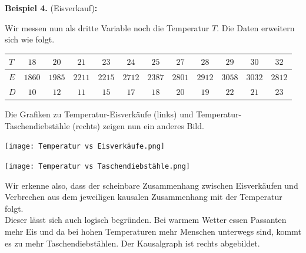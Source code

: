 \documentclass[headsepline,11pt,bibliography=leveldown]{scrbook}
\newcounter{NewZaehler}
\newcommand{\NewZahl}{\refstepcounter{NewZaehler}4.\theNewZaehler}
\newenvironment{NewBeispiel}[1]{\par\medskip\textbf{Beispiel \NewZahl} #1\textbf{:}\\}{\par\medskip}
\newcommand{\kom}[1]{\ignorespaces}
\begin{document}
\begin{NewBeispiel}{(Eisverkauf)\cite[S. 54f]{Primer}}
\begin{center}
\end{center}

Wir messen nun als dritte Variable noch die Temperatur $T$. Die Daten erweitern sich wie folgt.
\begin{center}
\begin{tabular}{| l | c | c | c | c | c | c | c | c | c | c | c |}
\hline
$T$ & $18$ & $20$ & $21$ & $23$ & $24$ & $25$ & $27$ & $28$ & $29$ & $30$ & $32$\\
\hline
$E$ & $1860$ & $1985$ & $2211$ & $2215$ & $2712$ & $2387$ & $2801$ & $2912$ & $3058$ & $3032$ & $2812$\\
\hline
$D$ & $10$ & $12$ & $11$ & $15$ & $17$ & $18$ & $20$ & $19$ & $22$ & $21$ & $23$\\
\hline
\end{tabular}
\end{center}
Die Grafiken zu Temperatur-Eisverkäufe (links) \kom{Eis-Taschendiebstähle-Temperatur.py} und Temperatur-Taschendiebstähle (rechts) \kom{Eis-Taschendiebstähle-Temperatur.py} zeigen nun ein anderes Bild.\\
\begin{minipage}{0.5\linewidth}
\begin{center}
	\texttt{[image: Temperatur vs Eisverkäufe.png]}
\end{center}
\end{minipage}
\begin{minipage}{0.5\linewidth}
\begin{center}
	\texttt{[image: Temperatur vs Taschendiebstähle.png]}
\end{center}
\end{minipage}
\begin{minipage}{0.5\linewidth}
Wir erkenne also, dass der scheinbare Zusammenhang zwischen Eisverkäufen und Verbrechen aus dem jeweiligen kausalen Zusammenhang mit der Temperatur folgt.\\
Dieser lässt sich auch logisch begründen. Bei warmem Wetter essen Passanten mehr Eis und da bei hohen Temperaturen mehr Menschen unterwegs sind, kommt es zu mehr Taschendiebstählen. Der Kausalgraph ist rechts abgebildet.\\
\end{minipage}
\begin{minipage}{0.5\linewidth}
\begin{center}
\end{center}
\end{minipage}
\end{NewBeispiel}
\end{document}
